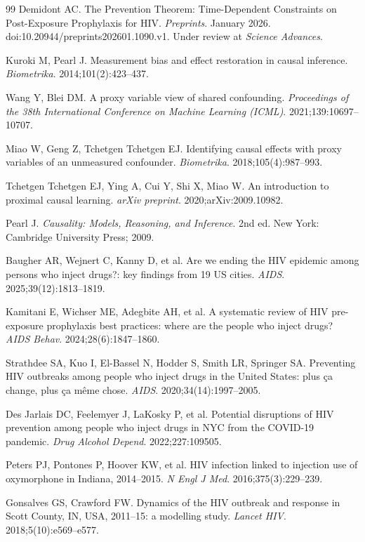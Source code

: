 \documentclass[11pt]{article}
\begin{document}
\begin{thebibliography}{99}
 Demidont AC. The Prevention Theorem: Time-Dependent Constraints on Post-Exposure Prophylaxis for HIV. \emph{Preprints}. January 2026. doi:10.20944/preprints202601.1090.v1. Under review at \emph{Science Advances}.

 Kuroki M, Pearl J. Measurement bias and effect restoration in causal inference. \emph{Biometrika}. 2014;101(2):423--437.

 Wang Y, Blei DM. A proxy variable view of shared confounding. \emph{Proceedings of the 38th International Conference on Machine Learning (ICML)}. 2021;139:10697--10707.

 Miao W, Geng Z, Tchetgen Tchetgen EJ. Identifying causal effects with proxy variables of an unmeasured confounder. \emph{Biometrika}. 2018;105(4):987--993.

 Tchetgen Tchetgen EJ, Ying A, Cui Y, Shi X, Miao W. An introduction to proximal causal learning. \emph{arXiv preprint}. 2020;arXiv:2009.10982.

 Pearl J. \emph{Causality: Models, Reasoning, and Inference}. 2nd ed. New York: Cambridge University Press; 2009.

 Baugher AR, Wejnert C, Kanny D, et al. Are we ending the HIV epidemic among persons who inject drugs?: key findings from 19 US cities. \emph{AIDS}. 2025;39(12):1813--1819.

 Kamitani E, Wichser ME, Adegbite AH, et al. A systematic review of HIV pre-exposure prophylaxis best practices: where are the people who inject drugs? \emph{AIDS Behav}. 2024;28(6):1847--1860.

 Strathdee SA, Kuo I, El-Bassel N, Hodder S, Smith LR, Springer SA. Preventing HIV outbreaks among people who inject drugs in the United States: plus \c{c}a change, plus \c{c}a m\^eme chose. \emph{AIDS}. 2020;34(14):1997--2005.

 Des Jarlais DC, Feelemyer J, LaKosky P, et al. Potential disruptions of HIV prevention among people who inject drugs in NYC from the COVID-19 pandemic. \emph{Drug Alcohol Depend}. 2022;227:109505.

 Peters PJ, Pontones P, Hoover KW, et al. HIV infection linked to injection use of oxymorphone in Indiana, 2014--2015. \emph{N Engl J Med}. 2016;375(3):229--239.

 Gonsalves GS, Crawford FW. Dynamics of the HIV outbreak and response in Scott County, IN, USA, 2011--15: a modelling study. \emph{Lancet HIV}. 2018;5(10):e569--e577.


\end{thebibliography}
\end{document}
